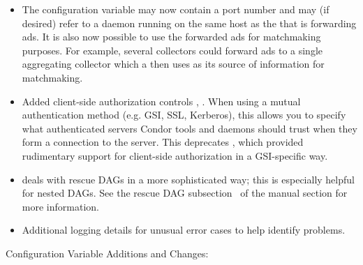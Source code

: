 \begin{itemize}
\item The configuration variable  may now
  contain a port number and may (if desired) refer to a
   daemon running on the same host as the
   that is forwarding ads.  It is also now possible to
  use the forwarded ads for matchmaking purposes.  For example, several
  collectors could forward ads to a single aggregating collector which
  a  then uses as its source of information for
  matchmaking.

\item Added client-side authorization controls
, .  When using a mutual
authentication method (e.g. GSI, SSL, Kerberos), this allows you to
specify what authenticated servers Condor tools and daemons should
trust when they form a connection to the server.  This deprecates
, which provided rudimentary support for
client-side authorization in a GSI-specific way.

\item {} deals with rescue DAGs in a more sophisticated
way; this is especially helpful for nested DAGs.
See the rescue DAG subsection~\pageref{sec:DAGRescue} of the 
manual section for more information.

\item Additional logging details for unusual error cases to help 
identify problems.


\end{itemize}

\noindent Configuration Variable Additions and Changes:

